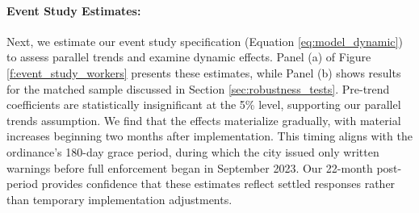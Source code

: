 \documentclass[letterpaper,11pt,leqno]{article}
\theoremstyle{paper}
\begin{document}
\paragraph{Event Study Estimates:}
Next, we estimate our event study specification (Equation \ref{eq:model_dynamic}) to assess parallel trends and examine dynamic effects. Panel (a) of Figure \ref{f:event_study_workers} presents these estimates, while Panel (b) shows results for the matched sample discussed in Section \ref{sec:robustness_tests}. Pre-trend coefficients are statistically insignificant at the 5\% level, supporting our parallel trends assumption. We find that the effects materialize gradually, with material increases beginning two months after implementation. This timing aligns with the ordinance's 180-day grace period, during which the city issued only written warnings before full enforcement began in September 2023. Our 22-month post-period provides confidence that these estimates reflect settled responses rather than temporary implementation adjustments.
\end{document}
